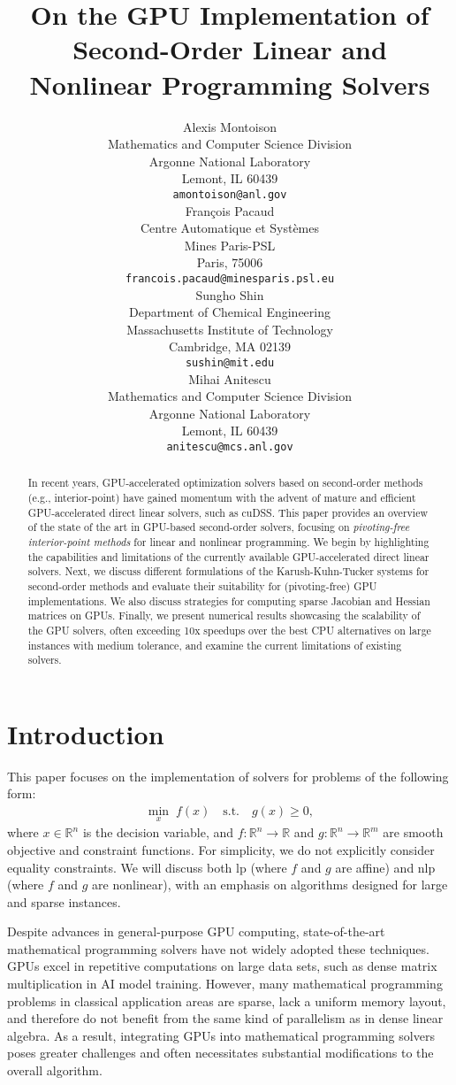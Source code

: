 \documentclass{article}
\title{On the GPU Implementation of Second-Order Linear and Nonlinear Programming Solvers}
\author{%
  Alexis Montoison\\
  Mathematics and Computer Science Division\\
  Argonne National Laboratory\\
  Lemont, IL 60439\\
  \texttt{amontoison@anl.gov}\\
  \And
  Fran\c{c}ois Pacaud\\
  Centre Automatique et Systèmes\\
  Mines Paris-PSL\\
  Paris, 75006 \\
  \texttt{francois.pacaud@minesparis.psl.eu}\\
  \And
  Sungho Shin\\
  Department of Chemical Engineering\\
  Massachusetts Institute of Technology\\
  Cambridge, MA 02139\\
  \texttt{sushin@mit.edu}\\
  \And
  Mihai Anitescu\\
  Mathematics and Computer Science Division\\
  Argonne National Laboratory\\
  Lemont, IL 60439\\
  \texttt{anitescu@mcs.anl.gov}\\
}
\begin{document}
\maketitle


\begin{abstract}
In recent years, GPU-accelerated optimization solvers based on second-order methods (e.g., interior-point) have gained momentum with the advent of mature and efficient GPU-accelerated direct linear solvers, such as cuDSS. This paper provides an overview of the state of the art in GPU-based second-order solvers, focusing on \emph{pivoting-free interior-point methods} for linear and nonlinear programming. We begin by highlighting the capabilities and limitations of the currently available GPU-accelerated direct linear solvers. Next, we discuss different formulations of the Karush-Kuhn-Tucker systems for second-order methods and evaluate their suitability for (pivoting-free) GPU implementations. We also discuss strategies for computing sparse Jacobian and Hessian matrices on GPUs. Finally, we present numerical results showcasing the scalability of the GPU solvers, often exceeding 10x speedups over the best CPU alternatives on large instances with medium tolerance, and examine the current limitations of existing solvers.
\end{abstract}

\section{Introduction}\label{eqn:intro}

This paper focuses on the implementation of solvers for problems of the following form:
\begin{align}\label{eqn:opt}
  \min_{x } \; f(x) \quad \text{s.t.} \quad g(x) \geq 0,
\end{align}
where \(x \in \mathbb{R}^n\) is the decision variable, and \(f: \mathbb{R}^n \to \mathbb{R}\) and \(g: \mathbb{R}^n \to \mathbb{R}^m\) are smooth objective and constraint functions. 
For simplicity, we do not explicitly consider equality constraints. 
We will discuss both \gls*{lp} (where \(f\) and \(g\) are affine) and \gls*{nlp} (where \(f\) and \(g\) are nonlinear), with an emphasis on algorithms designed for large and sparse instances.

Despite advances in general-purpose GPU computing, state-of-the-art mathematical programming solvers have not widely adopted these techniques. GPUs excel in repetitive computations on large data sets, such as dense matrix multiplication in AI model training. However, many mathematical programming problems in classical application areas are sparse, lack a uniform memory layout, and therefore do not benefit from the same kind of parallelism as in dense linear algebra. As a result, integrating GPUs into mathematical programming solvers poses greater challenges and often necessitates substantial modifications to the overall algorithm.
\end{document}
